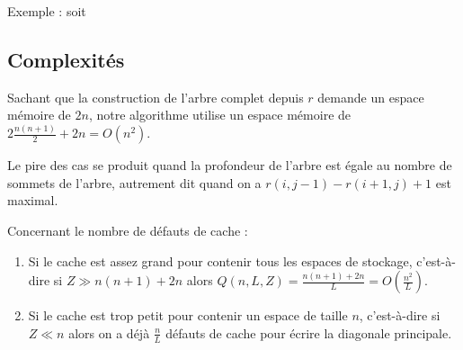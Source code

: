 \documentclass[12pt,a4paper]{article}
\begin{document}
	Exemple : soit 

	\subsection{Complexités}
Sachant que la construction de l'arbre complet depuis $r$ demande un espace mémoire de $2n$, notre algorithme utilise un espace mémoire de $2\frac{n(n+1)}{2} + 2n = O(n^2)$. \par\leavevmode\par 
Le pire des cas se produit quand la profondeur de l'arbre est égale au nombre de sommets de l'arbre, autrement dit quand on a $r(i, j - 1) - r(i + 1, j) + 1$ est maximal. \par\leavevmode\par 
Concernant le nombre de défauts de cache :
\begin{enumerate}
	\item Si le cache est assez grand pour contenir tous les espaces de stockage, c'est-à-dire si $Z \gg n(n+1) + 2n$ alors $Q(n, L, Z) = \frac{n(n+1) + 2n}{L} = O(\frac{n^2}{L})$. 
	\item Si le cache est trop petit pour contenir un espace de taille $n$, c'est-à-dire si $Z \ll n$ alors on a déjà $\frac{n}{L}$ défauts de cache pour écrire la diagonale principale.
\end{enumerate} 
\end{document}
